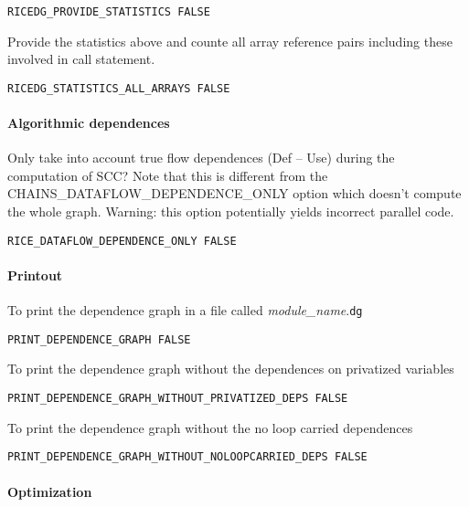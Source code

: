\begin{verbatim}
RICEDG_PROVIDE_STATISTICS FALSE
\end{verbatim}

Provide the statistics above and counte all array reference pairs
including these involved in call statement.

\begin{verbatim}
RICEDG_STATISTICS_ALL_ARRAYS FALSE
\end{verbatim}

\paragraph{Algorithmic dependences}

Only take into account true flow dependences (Def -- Use) during the computation of
SCC?  Note that this is different from the
CHAINS\_DATAFLOW\_DEPENDENCE\_ONLY option which doesn't compute the whole
graph.  Warning: this option potentially yields incorrect parallel code.

\begin{verbatim}
RICE_DATAFLOW_DEPENDENCE_ONLY FALSE
\end{verbatim}

\paragraph{Printout}

To print the dependence graph in a file called {\em module\_name}.{\tt dg}

\begin{verbatim}
PRINT_DEPENDENCE_GRAPH FALSE
\end{verbatim}

To print the dependence graph without the dependences on privatized
variables 

\begin{verbatim}
PRINT_DEPENDENCE_GRAPH_WITHOUT_PRIVATIZED_DEPS FALSE
\end{verbatim}

To print the dependence graph without the no loop carried dependences
 
\begin{verbatim}
PRINT_DEPENDENCE_GRAPH_WITHOUT_NOLOOPCARRIED_DEPS FALSE
\end{verbatim}

\paragraph{Optimization}

